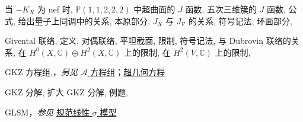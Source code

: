 \begin{theindex}
\subsubitem \leavevmode\hypertarget{idx:0428}{当 $-K_X$ 为 nef 时},\enspace{}
\subitem \leavevmode\hypertarget{idx:0429}{$\mathbb P(1,1,2,2,2)$ 中超曲面的 $J$ 函数},\enspace{}
\subitem \leavevmode\hypertarget{idx:0430}{五次三维簇的 $J$ 函数},\enspace{}
\subitem \leavevmode\hypertarget{idx:0431}{公式},\enspace{}
\subitem \leavevmode\hypertarget{idx:0432}{给出量子上同调中的关系},\enspace{}
\subitem \leavevmode\hypertarget{idx:0433}{本原部分},\enspace{}
\subitem \leavevmode\hypertarget{idx:0434}{$J_X$ 与 $J_{\mathcal V}$ 的关系},\enspace{}
\subitem \leavevmode\hypertarget{idx:0435}{符号记法},\enspace{}
\subitem \leavevmode\hypertarget{idx:0436}{环面部分},\enspace{}
\indexspace
\item \leavevmode\hypertarget{idx:0437}{Givental 联络},\enspace{}
\subitem \leavevmode\hypertarget{idx:0438}{定义},\enspace{}
\subitem \leavevmode\hypertarget{idx:0439}{对偶联络},\enspace{}
\subsubitem \leavevmode\hypertarget{source:481}{}\hypertarget{idx:0440}{平坦截面},\enspace{}
\IndexSubSubSubItem \leavevmode\hypertarget{idx:0441}{限制},\enspace{}
\IndexSubSubSubItem \leavevmode\hypertarget{idx:0442}{符号记法},\enspace{}
\subitem \leavevmode\hypertarget{idx:0443}{与 Dubrovin 联络的关系},\enspace{}
\subitem \leavevmode\hypertarget{idx:0444}{在 $H^0(X,\mathbb C)\oplus H^2(X,\mathbb C)$ 上的限制},\enspace{}
\subitem \leavevmode\hypertarget{idx:0445}{在 $H^2(V,\mathbb C)$ 上的限制},\enspace{}
\indexspace
\item \leavevmode\hypertarget{idx:0449}{GKZ 方程组},\enspace{}，\textit{另见} \hyperlink{idx:0055}{$\mathcal A$ 方程组}；\hyperlink{idx:0615}{超几何方程}
\indexspace
\item \leavevmode\hypertarget{idx:0446}{GKZ 分解},\enspace{}
\subitem \leavevmode\hypertarget{idx:0447}{扩大 GKZ 分解},\enspace{}
\subitem \leavevmode\hypertarget{idx:0448}{例题},\enspace{}
\indexspace
\item \leavevmode\hypertarget{idx:0450}{GLSM}，\textit{参见} \hyperlink{idx:0354}{规范线性 $\sigma$ 模型}

\end{theindex}
